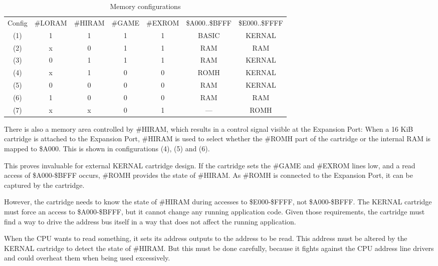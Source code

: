\documentclass[a4paper,oneside]{memoir}
\begin{document}
\begin{table}
    \begin{tabularx}{1.04\textwidth}{ccccccc}
        \toprule
        Config & \#LORAM & \#HIRAM & \#GAME & \#EXROM & \$A000..\$BFFF & \$E000..\$FFFF \\[3pt]
        (1)    & 1       & 1       & 1      & 1       & BASIC          & KERNAL \\[3pt]
        (2)    & x       & 0       & 1      & 1       & RAM            & RAM    \\[3pt]
        (3)    & 0       & 1       & 1      & 1       & RAM            & KERNAL \\[3pt]
        \midrule
        (4)    & x       & 1       & 0      & 0       & ROMH           & KERNAL \\[3pt]
        (5)    & 0       & 0       & 0      & 0       & RAM            & KERNAL \\[3pt]
        (6)    & 1       & 0       & 0      & 0       & RAM            & RAM    \\[3pt]
        \midrule
        (7)    & x       & x       & 0      & 1       & ---            & ROMH   \\[3pt]
        \bottomrule
    \end{tabularx}
    \caption{Memory configurations}
    \label{tab:mem-configs}
\end{table}

There is also a memory area controlled by \#HIRAM, which results in a
control signal visible at the Expansion Port: When a 16 KiB
cartridge is attached to the Expansion Port, \#HIRAM is used to
select whether the \#ROMH part of the cartridge or the internal RAM
is mapped to \$A000. This is shown in configurations (4), (5) and (6).

This proves invaluable for external KERNAL cartridge design. If the
cartridge sets the \#GAME and \#EXROM lines low, and a read
access of \$A000-\$BFFF occurs, \#ROMH provides the state of
\#HIRAM. As \#ROMH is connected to the Expansion Port, it can be
captured by the cartridge.

However, the cartridge needs to know the state of \#HIRAM during 
accesses to \$E000-\$FFFF, not \$A000-\$BFFF. The KERNAL
cartridge must force an access to \$A000-\$BFFF, but it cannot
change any running application code. Given those requirements, the
cartridge must find a way to drive the address bus itself in a way
that does not affect the running application.

When the CPU wants to read something, it sets its address outputs to
the address to be read. This address must be altered by the KERNAL 
cartridge to detect the state of \#HIRAM. But this must be done 
carefully, because it fights against the CPU address
line drivers and could overheat them when being used excessively.
\end{document}
